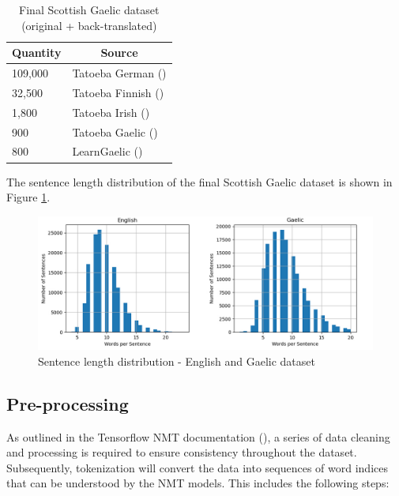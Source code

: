 \begin{table}[!ht]
\centering
\begin{tabular}{|l|l|}
\hline
\multicolumn{1}{|c|}{\textbf{Quantity}} & \multicolumn{1}{|c|}{\textbf{Source}} \\ \hline
109,000  & Tatoeba German (\cite{tatoeba_data_2020}) \\ \hline %
32,500  & Tatoeba Finnish (\cite{tatoeba_data_2020}) \\ \hline %
1,800   & Tatoeba Irish (\cite{tatoeba_data_2020}) \\ \hline
900     & Tatoeba Gaelic (\cite{tatoeba_data_2020}) \\ \hline
800     & LearnGaelic (\cite{learn_gaelic_2019}) \\ \hline
\end{tabular}
\captionsetup{justification=centering}
\caption{Final Scottish Gaelic dataset (original + back-translated)}
\label{tab:low_resource-data}
\end{table}

The sentence length distribution of the final Scottish Gaelic dataset is shown in Figure \ref{fig:sentence_length-gaelic}.
\begin{figure}[ht!]
\centering
\includegraphics[width=1\textwidth]{media/methodology/s_length-2-en_gd.jpg}
\captionsetup{justification=centering}
\caption[Diagram of the Scottish Gaelic dataset sentence length distribution]{Sentence length distribution - English and Gaelic dataset}
\label{fig:sentence_length-gaelic}
\end{figure}


\subsection{Pre-processing}

As outlined in the Tensorflow \acrshort{NMT} documentation (\cite{tensorflow_preprocess_2020}), a series of data cleaning and processing is required to ensure consistency throughout the dataset. Subsequently, tokenization will convert the data into sequences of word indices that can be understood by the \acrshort{NMT} models. This includes the following steps:

